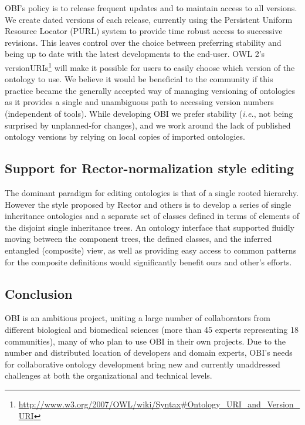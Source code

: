 \documentclass{elsart}       %
\begin{document}
OBI's policy is to release frequent updates and to maintain access to all versions.
We create dated versions of each release, currently using the Persistent Uniform Resource Locator (PURL)\cite{purl} system to provide time robust access to successive revisions.
This leaves control over the choice between preferring stability and being up to date with the latest developments to the end-user.
OWL 2's versionURIs\footnote{\url{http://www.w3.org/2007/OWL/wiki/Syntax#Ontology_URI_and_Version_URI}} will make it possible for users to easily choose which version of the ontology to use.
We believe it would be beneficial to the community if this practice became the generally accepted way of managing versioning of ontologies as it provides a single and unambiguous path to accessing version numbers (independent of tools). 
While developing OBI we prefer stability (\emph{i.e.}, not being surprised by unplanned-for changes), and we work around the lack of published ontology versions by relying on local copies of imported ontologies.

\subsection{Support for Rector-normalization style editing}

The dominant paradigm for editing ontologies is that of a single rooted hierarchy.
However the style proposed by Rector and others is to develop a series of single inheritance ontologies and a separate set of classes defined in terms of elements of the disjoint single inheritance trees.
An ontology interface that supported fluidly moving between the component trees, the defined classes, and the inferred entangled (composite) view, as well as providing easy access to common patterns for the composite definitions would significantly benefit ours and other’s efforts.

\subsection{Conclusion}
OBI is an ambitious project, uniting a large number of collaborators from different biological and biomedical sciences (more than 45 experts representing 18 communities), many of who plan to use OBI in their own projects.
Due to the number and distributed location of developers and domain experts, OBI’s needs for collaborative ontology development bring new and currently unaddressed challenges at both the organizational and technical levels.
\end{document}
